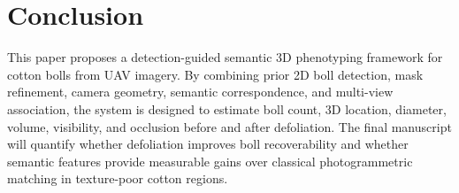 \section{Conclusion}

This paper proposes a detection-guided semantic 3D phenotyping framework for cotton bolls from UAV imagery. By combining prior 2D boll detection, mask refinement, camera geometry, semantic correspondence, and multi-view association, the system is designed to estimate boll count, 3D location, diameter, volume, visibility, and occlusion before and after defoliation. The final manuscript will quantify whether defoliation improves boll recoverability and whether semantic features provide measurable gains over classical photogrammetric matching in texture-poor cotton regions.
